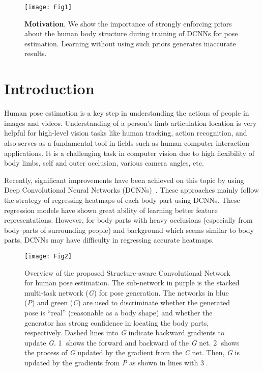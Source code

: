 \documentclass[10pt,letterpaper,twocolumn]{article}
\begin{document}
\tableofcontents
\clearpage



\begin{figure*}[h!]
\centering
\texttt{[image: Fig1]}
\caption{\textbf{Motivation}. We show the importance of strongly enforcing priors about the human body structure during  training of DCNNs for pose estimation. Learning without using such priors generates inaccurate results.}
\label{fig:The-blue-shape}
\end{figure*}

\section{Introduction}\label{sec:Introduction}

Human pose estimation is a key step in understanding the actions of people in images and videos. Understanding of a person's limb articulation location is very helpful for high-level vision tasks like human tracking, action recognition, and also serves as a fundamental tool in fields such as human-computer interaction applications. It is a challenging task in computer vision due to high flexibility of body limbs, self and outer occlusion, various camera angles, etc.

Recently, significant improvements have been achieved on this topic by using Deep Convolutional Neural Networks (DCNNs)~\cite{conf/nips/TompsonJLB14,conf/cvpr/TompsonGJLB15,conf/cvpr/ToshevS14,conf/cvpr/ChuOLW16,conf/cvpr/WeiRKS16,conf/eccv/NewellYD16,conf/eccv/BulatT16}. These approaches mainly follow the strategy of regressing heatmaps of each body part using DCNNs. These regression models have shown great ability of learning better feature representations. However, for body parts with heavy occlusions (especially from body parts of surrounding  people) and background which seems similar to body parts, DCNNs may have difficulty in regressing accurate heatmaps.

\begin{figure*}[!t]
\centering
\texttt{[image: Fig2]}
\caption{Overview of the proposed Structure-aware Convolutional Network for human pose estimation. The sub-network in purple is the stacked multi-task network (\emph{G}) for pose generation. The networks in blue (\emph{P}) and green (\emph{C}) are used to discriminate whether the generated pose is ``real'' (reasonable as a body shape) and whether the generator has strong confidence in locating the body parts, respectively. Dashed lines into \textit{G} indicate backward gradients to update \textit{G}. \textcircled{1} shows the forward and backward of the \textit{G} net. \textcircled{2} shows the process of \textit{G} updated by the gradient from the \textit{C} net. Then, \textit{G} is updated by the gradients from \textit{P} as shown in lines with \textcircled{3}.}
\label{fig:Structure-of-the}
\end{figure*}
\end{document}
